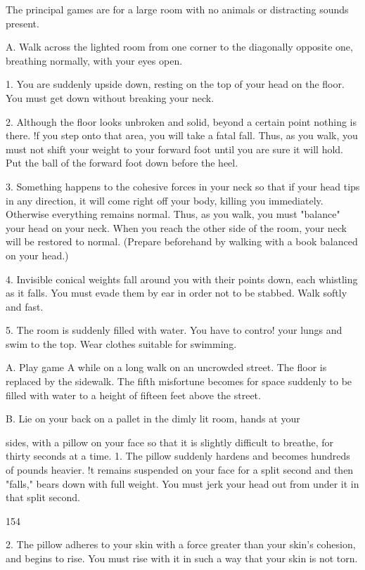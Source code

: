 \documentclass[10pt,twoside]{memoir}
\begin{document}
\begin{enumerate}
{\begin{enumerate}
\begin{sysrules}
\begin{sysrules}
\begin{sysrules}
\begin{sysrules}
{\begin{enumerate}
{{{{{{The principal games are for a large room with no animals or distracting 
sounds present. 

A. Walk across the lighted room from one corner to the diagonally 
opposite one, breathing normally, with your eyes open. 

1. You are suddenly upside down, resting on the top of your head on the 
floor. You must get down without breaking your neck. 

2. Although the floor looks unbroken and solid, beyond a certain point 
nothing is there. !f you step onto that area, you will take a fatal fall. Thus, as 
you walk, you must not shift your weight to your forward foot until you are 
sure it will hold. Put the ball of the forward foot down before the heel. 

3. Something happens to the cohesive forces in your neck so that if your 
head tips in any direction, it will come right off your body, killing you 
immediately. Otherwise everything remains normal. Thus, as you walk, you 
must "balance" your head on your neck. When you reach the other side of 
the room, your neck will be restored to normal. (Prepare beforehand by 
walking with a book balanced on your head.) 

4. Invisible conical weights fall around you with their points down, each 
whistling as it falls. You must evade them by ear in order not to be stabbed. 
Walk softly and fast. 

5. The room is suddenly filled with water. You have to contro! your lungs 
and swim to the top. Wear clothes suitable for swimming. 

A. Play game A while on a long walk on an uncrowded street. The floor 
is replaced by the sidewalk. The fifth misfortune becomes for space suddenly 
to be filled with water to a height of fifteen feet above the street. 

B. Lie on your back on a pallet in the dimly lit room, hands at your 

sides, with a pillow on your face so that it is slightly difficult to breathe, for 
thirty seconds at a time. 
1. The pillow suddenly hardens and becomes hundreds of pounds heavier. !t 
remains suspended on your face for a split second and then "falls," bears 
down with full weight. You must jerk your head out from under it in that 
split second. 


154 


2. The pillow adheres to your skin with a force greater than your skin's 
cohesion, and begins to rise. You must rise with it in such a way that your 
skin is not torn. 

}}}}}}
\end{enumerate}}
\end{sysrules}
\end{sysrules}
\end{sysrules}
\end{sysrules}
\end{enumerate}}
\end{enumerate}
\end{document}
